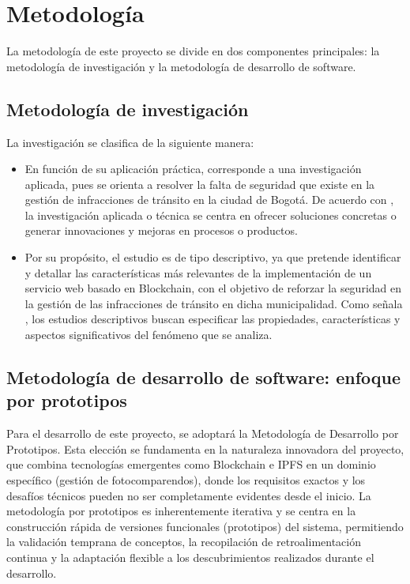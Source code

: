 \section{Metodología}
La metodología de este proyecto se divide en dos componentes principales: la metodología de investigación y la metodología de desarrollo de software.  

\subsection{Metodología de investigación}
La investigación se clasifica de la siguiente manera:
\begin{itemize}
  \item En función de su aplicación práctica, corresponde a una investigación aplicada, pues se orienta a resolver la falta de seguridad que existe en la gestión de infracciones de tránsito en la ciudad de Bogotá. De acuerdo con \parencite{coulouris2011}, la investigación aplicada o técnica se centra en ofrecer soluciones concretas o generar innovaciones y mejoras en procesos o productos.
  \item Por su propósito, el estudio es de tipo descriptivo, ya que pretende identificar y detallar las características más relevantes de la implementación de un servicio web basado en Blockchain, con el objetivo de reforzar la seguridad en la gestión de las infracciones de tránsito en dicha municipalidad. Como señala \parencite{vanSteen2017}, los estudios descriptivos buscan especificar las propiedades, características y aspectos significativos del fenómeno que se analiza.
\end{itemize}
\subsection{Metodología de desarrollo de software: enfoque por prototipos}
Para el desarrollo de este proyecto, se adoptará la Metodología de Desarrollo por Prototipos. Esta elección se fundamenta en la naturaleza innovadora del proyecto, que combina tecnologías emergentes como Blockchain e IPFS en un dominio específico (gestión de fotocomparendos), donde los requisitos exactos y los desafíos técnicos pueden no ser completamente evidentes desde el inicio. La metodología por prototipos es inherentemente iterativa y se centra en la construcción rápida de versiones funcionales (prototipos) del sistema, permitiendo la validación temprana de conceptos, la recopilación de retroalimentación continua y la adaptación flexible a los descubrimientos realizados durante el desarrollo. 
